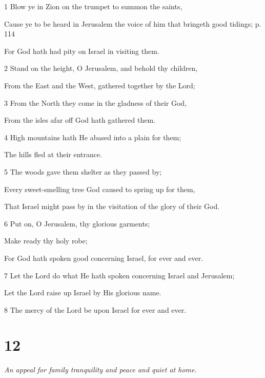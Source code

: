 \par 1 Blow ye in Zion on the trumpet to summon the saints,
\par  Cause ye to be heard in Jerusalem the voice of him that bringeth good tidings; p. 114
\par  For God hath had pity on Israel in visiting them.
\par 2 Stand on the height, O Jerusalem, and behold thy children,
\par  From the East and the West, gathered together by the Lord;
\par 3 From the North they come in the gladness of their God,
\par  From the isles afar off God hath gathered them.
\par 4 High mountains hath He abased into a plain for them;
\par  The hills fled at their entrance.
\par 5 The woods gave them shelter as they passed by;
\par  Every sweet-smelling tree God caused to spring up for them,
\par  That Israel might pass by in the visitation of the glory of their God.
\par 6 Put on, O Jerusalem, thy glorious garments;
\par  Make ready thy holy robe;
\par  For God hath spoken good concerning Israel, for ever and ever.
\par 7 Let the Lord do what He hath spoken concerning Israel and Jerusalem;
\par  Let the Lord raise up Israel by His glorious name.
\par    
\par 8 The mercy of the Lord be upon Israel for ever and ever.



\chapter{12}

\par \textit{An appeal for family tranquility and peace and quiet at home.}

